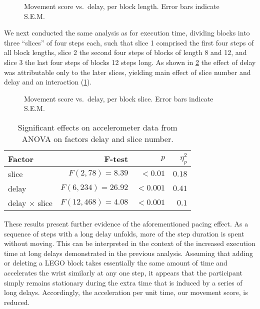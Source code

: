 \documentclass[10pt,letterpaper]{article}
\begin{document}
\begin{figure}[h]
    \centering
    \caption{Movement score vs.\ delay, per block length. Error bars indicate S.E.M.}\label{fig:acc:delaylength}
\end{figure}

We next conducted the same analysis as for execution time, dividing blocks into three ``slices'' of four steps each, such that slice 1 comprised the first four steps of all block lengths, slice 2 the second four steps of blocks of length 8 and 12, and slice 3 the last four steps of blocks 12 steps long.
As shown in \cref{fig:acc:delayslice} the effect of delay was attributable only to the later slices, yielding main effect of slice number and delay and an interaction (\cref{tab:anova:acc:slice}). 

\begin{figure}[h]
  \centering
  \caption{Movement score vs.\ delay, per block slice. Error bars indicate S.E.M.}\label{fig:acc:delayslice}
\end{figure}

\begin{table}[h]
  \centering
  \caption{Significant effects on accelerometer data from ANOVA on factors delay and slice number.}\label{tab:anova:acc:slice}
  \setlength{\tabcolsep}{0pt} %
  \begin{tabular*}{\columnwidth}{@{\extracolsep{\fill}\quad}lrrr@{}}
    \toprule
    \textbf{Factor} & \textbf{F-test} & \textbf{\(p\)} & \textbf{\(\eta^{2}_{p}\)} \\
    \midrule 
    slice & \(F(2, 78) = 8.39\) & \(<0.01\) & \(0.18\) \\
    delay & \(F(6, 234) = 26.92\) & \(<0.001\) & \(0.41\) \\
    delay \(\times\) slice & \(F(12, 468) = 4.08\) & \(<0.001\) & \(0.1\) \\
    \bottomrule
  \end{tabular*}%
\end{table}

These results present further evidence of the aforementioned pacing effect.
As a sequence of steps with a long delay unfolds, more of the step duration is spent without moving.
This can be interpreted in the context of the increased execution time at long delays demonstrated in the previous analysis.
Assuming that adding or deleting a LEGO block takes essentially the same amount of time and accelerates the wrist similarly at any one step, it appears that the participant simply remains stationary during the extra time that is induced by a series of long delays.
Accordingly, the acceleration per unit time, our movement score, is reduced.
\end{document}
